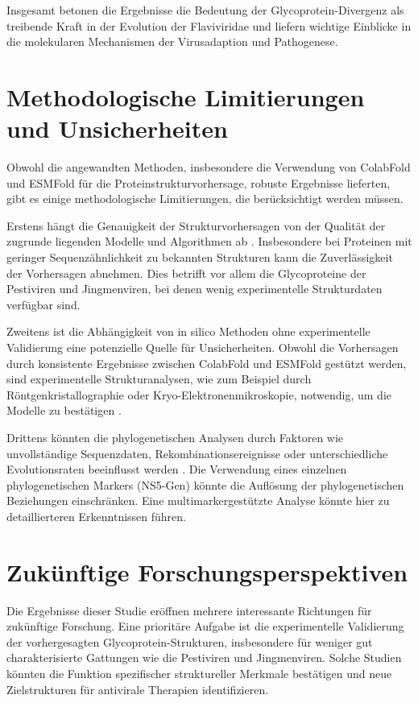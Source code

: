 Insgesamt betonen die Ergebnisse die Bedeutung der Glycoprotein-Divergenz als treibende Kraft in der Evolution der Flaviviridae und liefern wichtige Einblicke in die molekularen Mechanismen der Virusadaption und Pathogenese.

\section{Methodologische Limitierungen und Unsicherheiten} \label{sec:methodologische-limitierungen-und-unsicherheiten}

Obwohl die angewandten Methoden, insbesondere die Verwendung von ColabFold und ESMFold für die Proteinstrukturvorhersage, robuste Ergebnisse lieferten, gibt es einige methodologische Limitierungen, die berücksichtigt werden müssen.

Erstens hängt die Genauigkeit der Strukturvorhersagen von der Qualität der zugrunde liegenden Modelle und Algorithmen ab \autocite{Jumper2021}. Insbesondere bei Proteinen mit geringer Sequenzähnlichkeit zu bekannten Strukturen kann die Zuverlässigkeit der Vorhersagen abnehmen. Dies betrifft vor allem die Glycoproteine der Pestiviren und Jingmenviren, bei denen wenig experimentelle Strukturdaten verfügbar sind.

Zweitens ist die Abhängigkeit von in silico Methoden ohne experimentelle Validierung eine potenzielle Quelle für Unsicherheiten. Obwohl die Vorhersagen durch konsistente Ergebnisse zwischen ColabFold und ESMFold gestützt werden, sind experimentelle Strukturanalysen, wie zum Beispiel durch Röntgenkristallographie oder Kryo-Elektronenmikroskopie, notwendig, um die Modelle zu bestätigen \autocite{Callaway2020}.

Drittens könnten die phylogenetischen Analysen durch Faktoren wie unvollständige Sequenzdaten, Rekombinationsereignisse oder unterschiedliche Evolutionsraten beeinflusst werden \autocite{Felsenstein1985}. Die Verwendung eines einzelnen phylogenetischen Markers (NS5-Gen) könnte die Auflösung der phylogenetischen Beziehungen einschränken. Eine multimarkergestützte Analyse könnte hier zu detaillierteren Erkenntnissen führen.

\section{Zukünftige Forschungsperspektiven} \label{sec:zukuenftige-forschungsperspektiven}

Die Ergebnisse dieser Studie eröffnen mehrere interessante Richtungen für zukünftige Forschung. Eine prioritäre Aufgabe ist die experimentelle Validierung der vorhergesagten Glycoprotein-Strukturen, insbesondere für weniger gut charakterisierte Gattungen wie die Pestiviren und Jingmenviren. Solche Studien könnten die Funktion spezifischer struktureller Merkmale bestätigen und neue Zielstrukturen für antivirale Therapien identifizieren.

